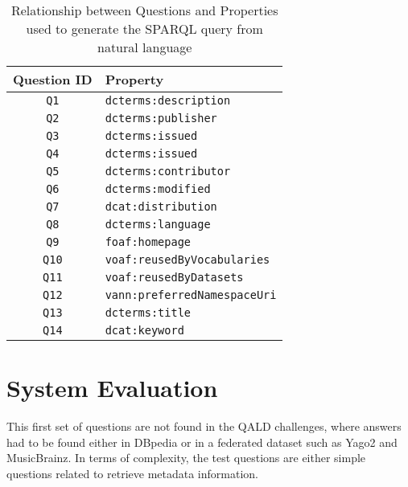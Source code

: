 \documentclass[runningheads,a4paper]{llncs}
\begin{document}
\begin{table}
\centering
\caption{Relationship between Questions and Properties used to generate the SPARQL query from natural language}
\label{tab:propTable}
\begin{tabular}{|c|l|} \hline
\textbf{Question ID} & \textbf{Property} \\ \hline
\texttt{Q1} & \texttt{dcterms:description}  \\ \hline
\texttt{Q2} & \texttt{dcterms:publisher}  \\ \hline 
\texttt{Q3} & \texttt{dcterms:issued}  \\ \hline
\texttt{Q4} & \texttt{dcterms:issued}  \\ \hline
\texttt{Q5} & \texttt{dcterms:contributor}  \\ \hline
\texttt{Q6} & \texttt{dcterms:modified}  \\ \hline
\texttt{Q7} & \texttt{dcat:distribution}  \\ \hline
\texttt{Q8} & \texttt{dcterms:language}  \\ \hline
\texttt{Q9} & \texttt{foaf:homepage}  \\ \hline
\texttt{Q10} & \texttt{voaf:reusedByVocabularies} \\ \hline
\texttt{Q11} & \texttt{voaf:reusedByDatasets} \\ \hline
\texttt{Q12} & \texttt{vann:preferredNamespaceUri} \\ \hline
\texttt{Q13} & \texttt{dcterms:title} \\ \hline
\texttt{Q14} & \texttt{dcat:keyword} \\ \hline

\end{tabular}
\end{table}




\section{System Evaluation}
\label{sec:evaluation}

This first set of questions are not found in the QALD challenges, where answers had to be found either in DBpedia or in a federated dataset such as Yago2 and MusicBrainz. In terms of complexity, the test questions are either simple questions related to retrieve metadata information. 
\end{document}
